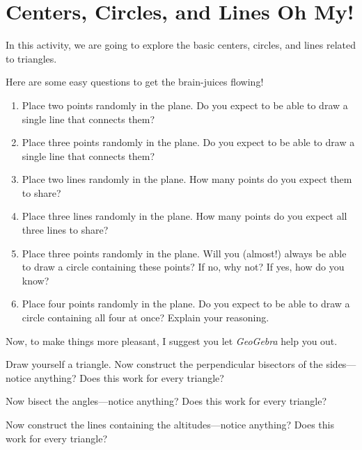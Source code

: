 \newpage
\section{Centers, Circles, and Lines Oh My!}

In this activity, we are going to explore the basic centers, circles,
and lines related to triangles.  

\begin{prob} Here are some easy questions to get the brain-juices flowing!
\begin{enumerate} 
\item Place two points randomly in the plane. Do you expect to be able to
draw a single line that connects them?
\item Place three points randomly in the plane. Do you expect to be able to
draw a single line that connects them?
\item Place two lines randomly in the plane. How many points do you expect
them to share?
\item Place three lines randomly in the plane. How many points do you expect
all three lines to share?
\item Place three points randomly in the plane. Will you (almost!) always be
able to draw a circle containing these points? If no, why not? If yes,
how do you know?
\item Place four points randomly in the plane. Do you expect to be able to
draw a circle containing all four at once? Explain your reasoning.
\end{enumerate}
\end{prob}


Now, to make things more pleasant, I suggest you let \textsl{GeoGebra}
help you out.

\begin{prob} 
Draw yourself a triangle. Now construct the perpendicular bisectors of
the sides---notice anything? Does this work for every triangle?
\end{prob}

\begin{prob}
Now bisect the angles---notice anything? Does this work for every
triangle?
\end{prob}

\begin{prob}
Now construct the lines containing the altitudes---notice anything?
Does this work for every triangle?
\end{prob}

